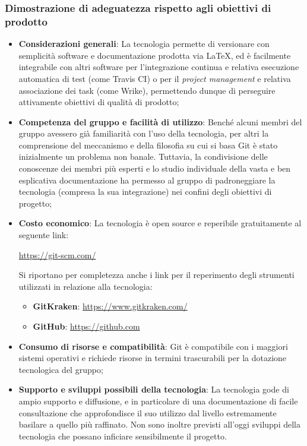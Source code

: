 \documentclass[./../Technology Baseline.tex]{subfiles}
\begin{document}
\subsubsection{Dimostrazione di adeguatezza rispetto agli obiettivi di prodotto}
\begin{itemize}
	\item \textbf{Considerazioni generali}: La tecnologia permette di versionare con semplicità software e documentazione prodotta via \LaTeX, ed è facilmente integrabile con altri software per l'integrazione continua e relativa esecuzione automatica di test (come Travis CI) o per il \textit{project management} e relativa associazione dei task (come Wrike), permettendo dunque di perseguire attivamente obiettivi di qualità di prodotto;
	\item \textbf{Competenza del gruppo e facilità di utilizzo}: Benché alcuni membri del gruppo avessero già familiarità con l'uso della tecnologia, per altri la comprensione del meccanismo e della filosofia su cui si basa Git è stato inizialmente un problema non banale. Tuttavia, la condivisione delle conoscenze dei membri più esperti e lo studio individuale della vasta e ben esplicativa documentazione ha permesso al gruppo di padroneggiare la tecnologia (compresa la sua integrazione) nei confini degli obiettivi di progetto;
	\item \textbf{Costo economico}: La tecnologia è open source e reperibile gratuitamente al seguente link:
	\begin{center}
		\url{https://git-scm.com/}
	\end{center}
	Si riportano per completezza anche i link per il reperimento degli strumenti utilizzati in relazione alla tecnologia:
	\begin{itemize}
		\item \textbf{GitKraken}: \url{https://www.gitkraken.com/} 
		\item \textbf{GitHub}: \url{https://github.com}
	\end{itemize}

	\item \textbf{Consumo di risorse e compatibilità}: Git è compatibile con i maggiori sistemi operativi e richiede risorse in termini trascurabili per la dotazione tecnologica del gruppo;
	\item \textbf{Supporto e sviluppi possibili della tecnologia}: La tecnologia gode di ampio supporto e diffusione, e in particolare di una documentazione di facile consultazione che approfondisce il suo utilizzo dal livello estremamente basilare a quello più raffinato. Non sono inoltre previsti all'oggi sviluppi della tecnologia che possano inficiare sensibilmente il progetto.
\end{itemize}
\end{document}
